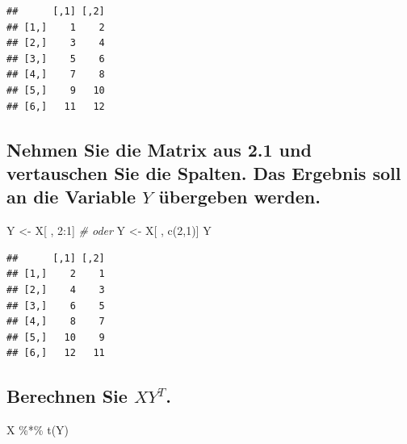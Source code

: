 \documentclass[12pt,a4paper]{article}
\newenvironment{Shaded}{\begin{snugshade}}{\end{snugshade}}
\newcommand{\CommentTok}[1]{\textcolor[rgb]{0.56,0.35,0.01}{\textit{#1}}}
\newcommand{\DecValTok}[1]{\textcolor[rgb]{0.00,0.00,0.81}{#1}}
\newcommand{\FunctionTok}[1]{\textcolor[rgb]{0.00,0.00,0.00}{#1}}
\newcommand{\NormalTok}[1]{#1}
\newcommand{\OtherTok}[1]{\textcolor[rgb]{0.56,0.35,0.01}{#1}}
\newcommand{\SpecialCharTok}[1]{\textcolor[rgb]{0.00,0.00,0.00}{#1}}
\begin{document}
\begin{verbatim}
##      [,1] [,2]
## [1,]    1    2
## [2,]    3    4
## [3,]    5    6
## [4,]    7    8
## [5,]    9   10
## [6,]   11   12
\end{verbatim}

\vspace{0.5cm}

\hypertarget{nehmen-sie-die-matrix-aus-2.1-und-vertauschen-sie-die-spalten.-das-ergebnis-soll-an-die-variable-y-uxfcbergeben-werden.}{%
\subsection{\texorpdfstring{Nehmen Sie die Matrix aus 2.1 und
vertauschen Sie die Spalten. Das Ergebnis soll an die Variable \(Y\)
übergeben
werden.}{Nehmen Sie die Matrix aus 2.1 und vertauschen Sie die Spalten. Das Ergebnis soll an die Variable Y übergeben werden.}}\label{nehmen-sie-die-matrix-aus-2.1-und-vertauschen-sie-die-spalten.-das-ergebnis-soll-an-die-variable-y-uxfcbergeben-werden.}}

\begin{Shaded}
\begin{Highlighting}[]
\NormalTok{    Y }\OtherTok{\textless{}{-}}\NormalTok{ X[ , }\DecValTok{2}\SpecialCharTok{:}\DecValTok{1}\NormalTok{] }\CommentTok{\# oder}
\NormalTok{    Y }\OtherTok{\textless{}{-}}\NormalTok{ X[ , }\FunctionTok{c}\NormalTok{(}\DecValTok{2}\NormalTok{,}\DecValTok{1}\NormalTok{)]}
\NormalTok{    Y}
\end{Highlighting}
\end{Shaded}

\begin{verbatim}
##      [,1] [,2]
## [1,]    2    1
## [2,]    4    3
## [3,]    6    5
## [4,]    8    7
## [5,]   10    9
## [6,]   12   11
\end{verbatim}

\vspace{0.5cm}

\hypertarget{berechnen-sie-xyt.}{%
\subsection{\texorpdfstring{Berechnen Sie
\(XY^{T}\).}{Berechnen Sie XY\^{}\{T\}.}}\label{berechnen-sie-xyt.}}

\begin{Shaded}
\begin{Highlighting}[]
\NormalTok{    X }\SpecialCharTok{\%*\%} \FunctionTok{t}\NormalTok{(Y)}
\end{Highlighting}
\end{Shaded}
\end{document}
